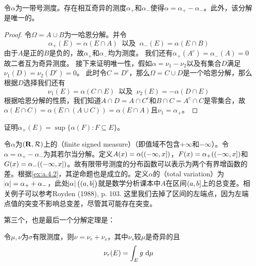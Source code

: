 \documentclass[main.tex]{subfiles}
\begin{document}
\begin{theorem}
	\label{thm:a.4.6}
	令\(\alpha\)为一带号测度。存在相互奇异的测度\(\alpha_+\)和\(\alpha_-\)使得\(\alpha=\alpha_+-\alpha_-\)。此外，该分解是唯一的。
\end{theorem}
\begin{proof}
	令\(\Omega = A\cup B\)为一哈恩分解。并令
	\[\alpha_+(E) = \alpha(E\cap A)\ \text{ 以及 }\ \alpha_-(E) = \alpha(E\cap B)\]
	由于\(A\)是正的\(B\)是负的，故\(\alpha_+\)和\(\alpha_-\)均为测度。
	我们还有\(\alpha_+(A^c)=\alpha_-(A)=0\)故二者互为奇异测度。
	接下来证明唯一性，假如\(\alpha=\nu_1-\nu_2\)以及有集合\(D\)满足\(\nu_1(D)=\nu_2(D^c)=0\)。
	此时令\(C=D^c\)，那么\(\Omega=C\cup D\)是一个哈恩分解，那么根据\(D\)选择我们还有
	\[\nu_1(E) = \alpha(C\cap E)\ \text{ 以及 }\ \nu_2(E)=-\alpha(D\cap E)\]
	根据哈恩分解的性质，我们知道\(A\cap D = A\cap C^c\)和\(B\cap C=A^c\cap C\)是零集合，故\(\alpha(E\cap C) = \alpha(E\cap(A\cup C)) = \alpha(E\cap A)\)且\(\nu_1=\alpha_+\)。
\end{proof}
\begin{exercise}[start=3]
	\item 证明\(\alpha_+(E)=\sup\{\alpha(F):F\subseteq E\}\)。
\end{exercise}
\begin{remark}
	令\(\alpha\)为\((\mathbf{R}, \mathcal{R})\)上的（finite signed measure）（即值域不包含\(+\infty\)和\(-\infty\)）。令\(\alpha=\alpha_+-\alpha_-\)为其若尔当分解。定义\(A(x) = \alpha(\intoc{-\infty,x})\)，\(F(x) = \alpha_+(\intoc{-\infty,x})\)和\(G(x) = \alpha_-(\intoc{-\infty,x})\)。故有限带号测度的分布函数可以表示为两个有界增函数的差。根据\ref{ex:a.4.2}，其逆命题也是成立的。定义\(\alpha\)的（total variation）为\(\envert{\alpha} = \alpha_++\alpha_-\)，此处\(\envert{\alpha}\del{\intoc{a, b}}\)就是数学分析课本中\(A\)在区间\(\intoc{a,b}\)上的总变差。相关例子可以参考Royden (1988), p. 103.
	这里我们去掉了区间的左端点，因为左端点值的突变不影响总变差，尽管其可能存在突变。
\end{remark}
第三个，也是最后一个分解定理是：
\begin{theorem}
	\label{thm:a.4.7}
	令\(\mu, \nu\)为\(\sigma\)有限测度，则\(\nu = \nu_r+\nu_s\)，其中\(\nu_s\)较\(\mu\)是奇异的且
	\[\nu_r(E) = \int_E g \,\dif\mu\]
\end{theorem}
\end{document}
